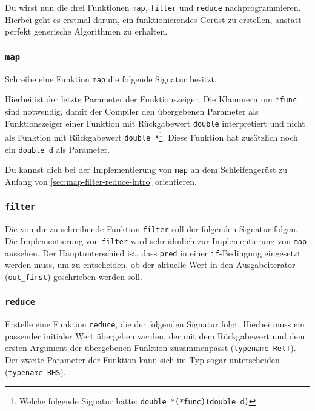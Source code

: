 Du wirst nun die drei Funktionen \lstinline{map}, \lstinline{filter} und \lstinline{reduce} nachprogrammieren.
Hierbei geht es erstmal darum, ein funktionierendes Gerüst zu erstellen, anstatt perfekt generische Algorithmen zu erhalten.

\subsubsection{\lstinline{map}}

Schreibe eine Funktion \lstinline{map} die folgende Signatur besitzt.


Hierbei ist der letzte Parameter der Funktionszeiger.
Die Klammern um \lstinline{*func} sind notwendig, damit der Compiler den übergebenen Parameter als Funktionszeiger einer Funktion mit Rückgabewert \lstinline{double} interpretiert und nicht als Funktion mit Rückgabewert \lstinline{double *}\footnote{Welche folgende Signatur hätte: \lstinline{double *(*func)(double d)}}.
Diese Funktion hat zusätzlich noch ein \lstinline{double d} als Parameter.

Du kannst dich bei der Implementierung von \lstinline|map| an dem Schleifengerüst zu Anfang von \ref{sec:map-filter-reduce-intro} orientieren.

\subsubsection{\lstinline{filter}}

Die von dir zu schreibende Funktion \lstinline{filter} soll der folgenden Signatur folgen.
%
%
Die Implementierung von \lstinline|filter| wird sehr ähnlich zur Implementierung von \lstinline|map| aussehen.
Der Hauptunterschied ist, dass \lstinline|pred| in einer \lstinline|if|-Bedingung eingesetzt werden muss, um zu entscheiden, ob der aktuelle Wert in den Ausgabeiterator (\lstinline|out_first|) geschrieben werden soll.

\subsubsection{\lstinline{reduce}}

Erstelle eine Funktion \lstinline{reduce}, die der folgenden Signatur folgt.
%
%
Hierbei muss ein passender initialer Wert übergeben werden, der mit dem Rückgabewert und dem ersten Argument der übergebenen Funktion zusammenpasst (\lstinline|typename RetT|).
Der zweite Parameter der Funktion kann sich im Typ sogar unterscheiden (\lstinline|typename RHS|).

